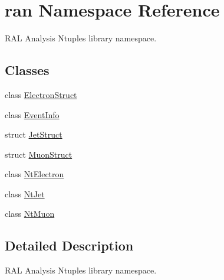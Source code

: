 \hypertarget{namespaceran}{\section{ran Namespace Reference}
\label{namespaceran}
}


R\-A\-L Analysis Ntuples library namespace.  


\subsection*{Classes}
\begin{DoxyCompactItemize}
\item 
class \hyperlink{classran_1_1ElectronStruct}{Electron\-Struct}
\item 
class \hyperlink{classran_1_1EventInfo}{Event\-Info}
\item 
struct \hyperlink{structran_1_1JetStruct}{Jet\-Struct}
\item 
struct \hyperlink{structran_1_1MuonStruct}{Muon\-Struct}
\item 
class \hyperlink{classran_1_1NtElectron}{Nt\-Electron}
\item 
class \hyperlink{classran_1_1NtJet}{Nt\-Jet}
\item 
class \hyperlink{classran_1_1NtMuon}{Nt\-Muon}
\end{DoxyCompactItemize}


\subsection{Detailed Description}
R\-A\-L Analysis Ntuples library namespace. 